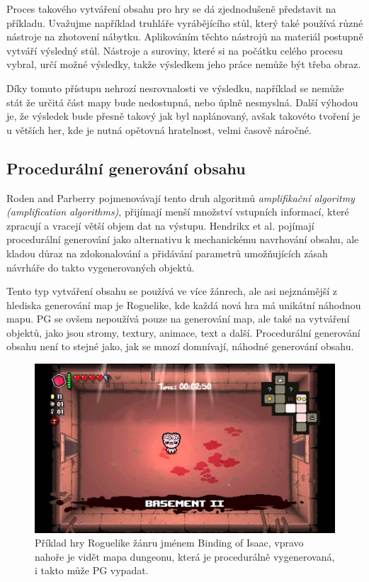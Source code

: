 Proces takového vytváření obsahu pro hry se dá zjednodušeně představit na příkladu. Uvažujme například truhláře vyrábějícího stůl, který také používá různé nástroje na zhotovení nábytku. Aplikováním těchto nástrojů na materiál postupně vytváří výsledný stůl. Nástroje a suroviny, které si na počátku celého procesu vybral, určí možné výsledky, takže výsledkem jeho práce nemůže být třeba obraz.

Díky tomuto přístupu nehrozí nesrovnalosti ve výsledku, například se nemůže stát že určitá část mapy bude nedostupná, nebo úplně nesmyslná. Další výhodou je, že výsledek bude přesně takový jak byl naplánovaný, avšak takovéto tvoření je u větších her, kde je nutná opětovná hratelnost, velmi časově náročné.

\subsection{Procedurální generování obsahu}
\label{procedural}
Roden and Parberry \cite{FromArtistry} pojmenovávají tento druh algoritmů \textit{amplifikační algoritmy (amplification algorithms)}, přijímají menší množství vstupních informací, které zpracují a vracejí větší objem dat na výstupu. Hendrikx et al. \cite{Hendrikx} pojímají procedurální generování jako alternativu k mechanickému navrhování obsahu, ale kladou důraz na zdokonalování a přidávání parametrů umožňujících zásah návrháře do takto vygenerovaných objektů.

Tento typ vytváření obsahu se používá ve více žánrech, ale asi nejznámější z hlediska generování map je Roguelike, kde každá nová hra má unikátní náhodnou mapu. PG se ovšem nepoužívá pouze na generování map, ale také na vytváření objektů, jako jsou stromy, textury, animace, text a další. Procedurální generování obsahu není to stejné jako, jak se mnozí domnívají, náhodné generování obsahu.
\begin{figure}[h]
	\centering
	\includegraphics[scale=0.33]{obrazky-figures/BindingOfIsaac.jpg}
	\caption{Příklad hry Roguelike žánru jménem Binding of Isaac, vpravo nahoře je vidět mapa dungeonu, která je procedurálně vygenerovaná, i takto může PG vypadat.}
\end{figure}


